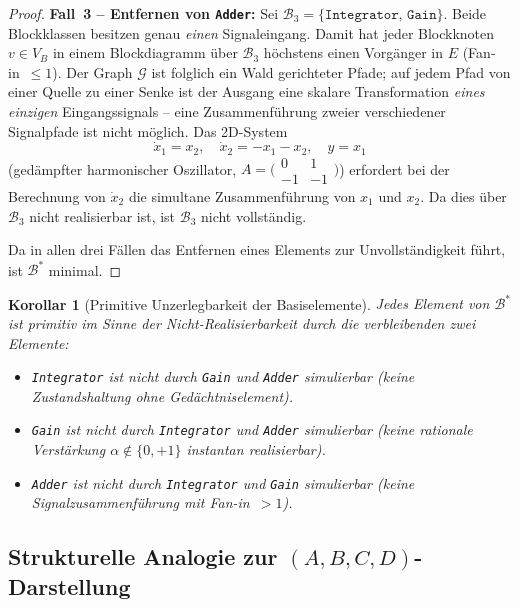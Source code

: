 ﻿\documentclass[12pt,a4paper]{article}
\newtheorem{korollar}[theorem]{Korollar}
\theoremstyle{definition}
\begin{document}
\begin{proof}
\medskip
\textbf{Fall~3 -- Entfernen von \texttt{Adder}:}
Sei $\mathcal{B}_3 = \{\texttt{Integrator},\,\texttt{Gain}\}$. Beide
Blockklassen besitzen genau \emph{einen} Signaleingang. Damit hat jeder
Blockknoten $v \in V_B$ in einem Blockdiagramm über $\mathcal{B}_3$
höchstens einen Vorgänger in $E$ (Fan-in~$\leq 1$). Der Graph
$\mathcal{G}$ ist folglich ein Wald gerichteter Pfade; auf jedem Pfad
von einer Quelle zu einer Senke ist der Ausgang eine skalare Transformation
\emph{eines einzigen} Eingangssignals -- eine Zusammenführung zweier
verschiedener Signalpfade ist nicht möglich. Das 2D-System
\[
  \dot{x}_1 = x_2,\quad
  \dot{x}_2 = -x_1 - x_2,\quad
  y = x_1
\]
(gedämpfter harmonischer Oszillator,
$A = \bigl(\begin{smallmatrix}0&1\\-1&-1\end{smallmatrix}\bigr)$)
erfordert bei der Berechnung von $\dot{x}_2$ die simultane Zusammenführung
von $x_1$ und $x_2$. Da dies über $\mathcal{B}_3$ nicht realisierbar ist,
ist $\mathcal{B}_3$ nicht vollständig.

\medskip
Da in allen drei Fällen das Entfernen eines Elements zur Unvollständigkeit
führt, ist $\mathcal{B}^*$ minimal.
\end{proof}

\begin{korollar}[Primitive Unzerlegbarkeit der Basiselemente]
\label{kor:unzerlegbar}
Jedes Element von $\mathcal{B}^*$ ist \emph{primitiv} im Sinne der
Nicht-Realisierbarkeit durch die verbleibenden zwei Elemente:
\begin{itemize}[nosep]
  \item \texttt{Integrator} ist nicht durch \texttt{Gain} und \texttt{Adder}
        simulierbar (keine Zustandshaltung ohne Gedächtniselement).
  \item \texttt{Gain} ist nicht durch \texttt{Integrator} und \texttt{Adder}
        simulierbar (keine rationale Verstärkung $\alpha \notin \{0,+1\}$
        instantan realisierbar).
  \item \texttt{Adder} ist nicht durch \texttt{Integrator} und \texttt{Gain}
        simulierbar (keine Signalzusammenführung mit Fan-in~$> 1$).
\end{itemize}
\end{korollar}

\subsection{Strukturelle Analogie zur $(A, B, C, D)$-Darstellung}
\end{document}
